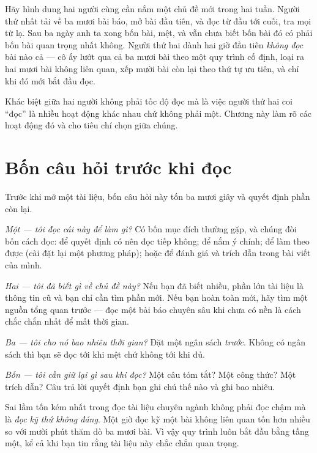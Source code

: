 \documentclass[../../english.tex]{subfiles}
\begin{document}
Hãy hình dung hai người cùng cần nắm một chủ đề mới trong hai tuần. Người thứ nhất tải về ba mươi bài báo, mở bài đầu tiên, và đọc từ đầu tới cuối, tra mọi từ lạ. Sau ba ngày anh ta xong bốn bài, mệt, và vẫn chưa biết bốn bài đó có phải bốn bài quan trọng nhất không. Người thứ hai dành hai giờ đầu tiên \emph{không đọc} bài nào cả --- cô ấy lướt qua cả ba mươi bài theo một quy trình cố định, loại ra hai mươi bài không liên quan, xếp mười bài còn lại theo thứ tự ưu tiên, và chỉ khi đó mới bắt đầu đọc.

Khác biệt giữa hai người không phải tốc độ đọc mà là việc người thứ hai coi ``đọc'' là nhiều hoạt động khác nhau chứ không phải một. Chương này làm rõ các hoạt động đó và cho tiêu chí chọn giữa chúng.

\section{Bốn câu hỏi trước khi đọc}

Trước khi mở một tài liệu, bốn câu hỏi này tốn ba mươi giây và quyết định phần còn lại.

\emph{Một --- tôi đọc cái này để làm gì?} Có bốn mục đích thường gặp, và chúng đòi bốn cách đọc: để quyết định có nên đọc tiếp không; để nắm ý chính; để làm theo được (cài đặt lại một phương pháp); hoặc để đánh giá và trích dẫn trong bài viết của mình.

\emph{Hai --- tôi đã biết gì về chủ đề này?} Nếu bạn đã biết nhiều, phần lớn tài liệu là thông tin cũ và bạn chỉ cần tìm phần mới. Nếu bạn hoàn toàn mới, hãy tìm một nguồn tổng quan trước --- đọc một bài báo chuyên sâu khi chưa có nền là cách chắc chắn nhất để mất thời gian.

\emph{Ba --- tôi cho nó bao nhiêu thời gian?} Đặt một ngân sách \emph{trước}. Không có ngân sách thì bạn sẽ đọc tới khi mệt chứ không tới khi đủ.

\emph{Bốn --- tôi cần giữ lại gì sau khi đọc?} Một câu tóm tắt? Một công thức? Một trích dẫn? Câu trả lời quyết định bạn ghi chú thế nào và ghi bao nhiêu.

\begin{cannho}
Sai lầm tốn kém nhất trong đọc tài liệu chuyên ngành không phải đọc chậm mà là \emph{đọc kỹ thứ không đáng}. Một giờ đọc kỹ một bài không liên quan tốn hơn nhiều so với mười phút thăm dò ba mươi bài. Vì vậy quy trình luôn bắt đầu bằng tầng một, kể cả khi bạn tin rằng tài liệu này chắc chắn quan trọng.
\end{cannho}
\end{document}
